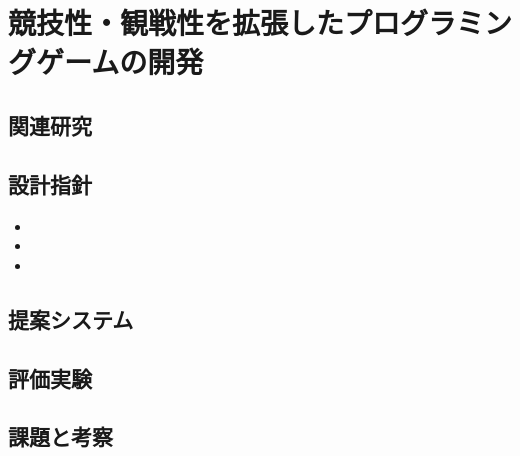 \section{競技性・観戦性を拡張したプログラミングゲームの開発}


\subsection{関連研究}

\subsection{設計指針}

\begin{itemize}
	\item 
	\item 
	\item 
\end{itemize}


\subsection{提案システム}

\subsection{評価実験}

\subsection{課題と考察}




